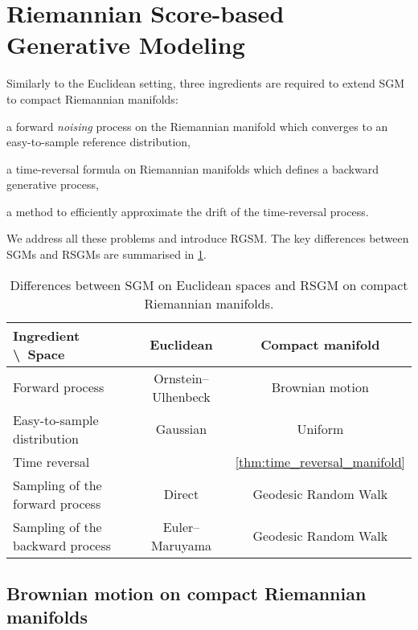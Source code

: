 \section{Riemannian Score-based Generative Modeling}
\label{sec:score-appr-manif}

Similarly to the Euclidean setting, three ingredients are required to extend SGM
to compact Riemannian manifolds:
\begin{enumerate*}[label=\roman*)]
\item a forward \emph{noising} process on the Riemannian manifold which converges to an easy-to-sample reference distribution, 
\item a time-reversal formula on Riemannian manifolds which defines a backward generative process, 
\item a method to efficiently approximate the drift of the time-reversal process.
\end{enumerate*}
We address all these problems and introduce RGSM. The key differences between
SGMs and RSGMs are summarised in \cref{tab:difference}.


\begin{table}[h]
\small
\centering
\renewcommand*{\arraystretch}{1.2}
\begin{tabular}{lcc}
  Ingredient \textbackslash ~Space  &       Euclidean                & Compact manifold \\ \hline
  Forward process & Ornstein--Ulhenbeck & Brownian motion \\
  Easy-to-sample distribution & Gaussian & Uniform \\
  Time reversal  &  \citet[Theorem 4.9]{cattiaux2021time} & \cref{thm:time_reversal_manifold}  \\   
  Sampling of the forward process & Direct & Geodesic Random Walk \\
  Sampling of the backward process & Euler--Maruyama & Geodesic Random Walk \\
\end{tabular}
\caption{\small Differences between SGM on Euclidean spaces and RSGM on compact Riemannian manifolds.}
\label{tab:difference}
\end{table}



\subsection{Brownian motion on compact Riemannian manifolds}
\label{sec:brown-moti-comp}

